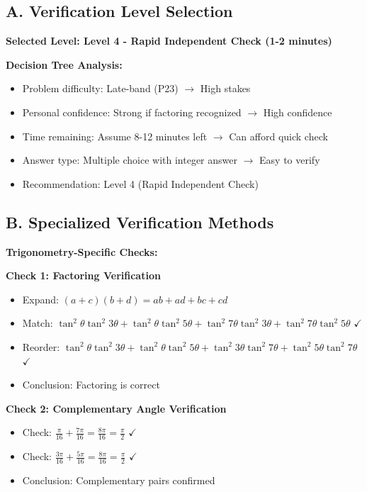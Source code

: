 \documentclass[12pt]{article}
\begin{document}
\begin{verificationbox}

\subsection*{A. Verification Level Selection}

\textbf{Selected Level: Level 4 - Rapid Independent Check (1-2 minutes)}

\textbf{Decision Tree Analysis:}
\begin{itemize}
    \item Problem difficulty: Late-band (P23) $\to$ High stakes
    \item Personal confidence: Strong if factoring recognized $\to$ High confidence
    \item Time remaining: Assume 8-12 minutes left $\to$ Can afford quick check
    \item Answer type: Multiple choice with integer answer $\to$ Easy to verify
    \item Recommendation: Level 4 (Rapid Independent Check)
\end{itemize}

\subsection*{B. Specialized Verification Methods}

\textbf{Trigonometry-Specific Checks:}

\textbf{Check 1: Factoring Verification}
\begin{itemize}
    \item Expand: $(a+c)(b+d) = ab + ad + bc + cd$
    \item Match: $\tan^2\theta\tan^2 3\theta + \tan^2\theta\tan^2 5\theta + \tan^2 7\theta\tan^2 3\theta + \tan^2 7\theta\tan^2 5\theta$ $\checkmark$
    \item Reorder: $\tan^2\theta\tan^2 3\theta + \tan^2\theta\tan^2 5\theta + \tan^2 3\theta\tan^2 7\theta + \tan^2 5\theta\tan^2 7\theta$ $\checkmark$
    \item Conclusion: Factoring is correct
\end{itemize}

\textbf{Check 2: Complementary Angle Verification}
\begin{itemize}
    \item Check: $\frac{\pi}{16} + \frac{7\pi}{16} = \frac{8\pi}{16} = \frac{\pi}{2}$ $\checkmark$
    \item Check: $\frac{3\pi}{16} + \frac{5\pi}{16} = \frac{8\pi}{16} = \frac{\pi}{2}$ $\checkmark$
    \item Conclusion: Complementary pairs confirmed
\end{itemize}


\end{verificationbox}
\end{document}
